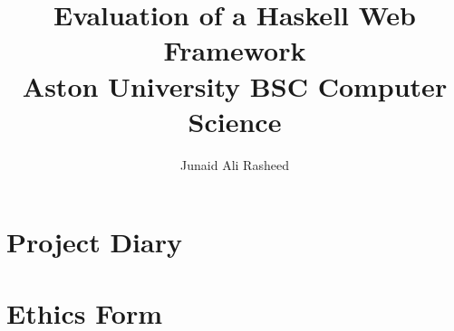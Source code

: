 \documentclass[a4paper,11pt,abstract=on,thesis,twoside]{report}
\title{
  {Evaluation of a Haskell Web Framework}\\
  {\large Aston University}
  {\large BSC Computer Science}
}
\author{Junaid Ali Rasheed}
\begin{document}


\maketitle



\tableofcontents
\listoffigures
\lstlistoflistings

\begin{abstract}
\lipsum[1-3]
\end{abstract}









\printbibliography[heading=bibintoc,title={References}]

\begin{refsection}
\nocite{*}
\printbibliography[heading=bibintoc,title={Bibliography}]  
\end{refsection}

\begin{appendices}

\chapter{Project Diary}


\chapter{Ethics Form}




\end{appendices}
\end{document}
